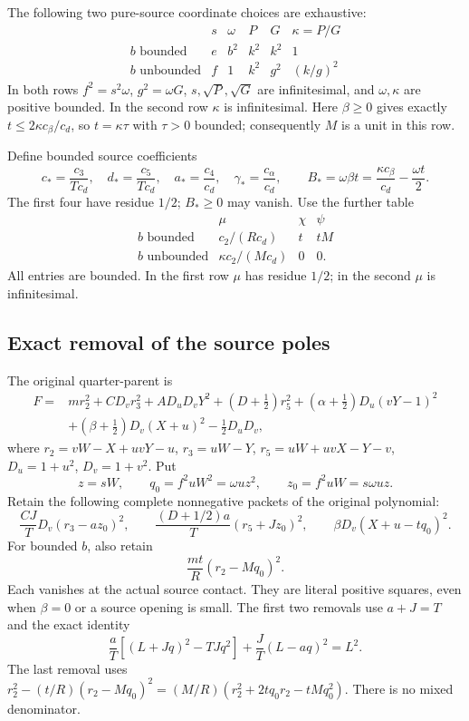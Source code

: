 The following two pure-source coordinate choices are exhaustive:
\[
\begin{array}{c|ccccc}
 &s&\omega&P&G&\kappa=P/G\\ \hline
 b\text{ bounded}&e&b^2&k^2&k^2&1\\
 b\text{ unbounded}&f&1&k^2&g^2&(k/g)^2
\end{array}                                                     \tag{EZ3}
\]
In both rows $f^2=s^2\omega$, $g^2=\omega G$,
$s,\sqrt P,\sqrt G$ are infinitesimal, and $\omega,\kappa$
are positive bounded. In the second row $\kappa$ is infinitesimal.
Here $\beta\geq0$ gives exactly
$t\leq2\kappa c_\beta/c_d$, so $t=\kappa\tau$ with
$\tau>0$ bounded; consequently $M$ is a unit in this row.

Define bounded source coefficients
\[
 c_*=\frac{c_3}{Tc_d},\quad d_*=\frac{c_5}{Tc_d},\quad
 a_*=\frac{c_4}{c_d},\quad \gamma_*=\frac{c_\alpha}{c_d},
 \qquad B_*=\omega\beta t
              =\frac{\kappa c_\beta}{c_d}-\frac{\omega t}{2}.
                                                               \tag{EZ4}
\]
The first four have residue $1/2$; $B_*\geq0$ may vanish.
Use the further table
\[
\begin{array}{c|ccc}
 &\mu&\chi&\psi\\ \hline
 b\text{ bounded}&c_2/(Rc_d)&t&tM\\
 b\text{ unbounded}&\kappa c_2/(Mc_d)&0&0 .
\end{array}                                                     \tag{EZ5}
\]
All entries are bounded. In the first row $\mu$ has residue
$1/2$; in the second $\mu$ is infinitesimal.

\subsection{Exact removal of the source poles}

The original quarter-parent is
\[
\begin{split}
 F={}&mr_2^2+CD_vr_3^2+AD_uD_vY^2
 +(D+\tfrac12)r_5^2+(\alpha+\tfrac12)D_u(vY-1)^2\\
 &+(\beta+\tfrac12)D_v(X+u)^2-\tfrac12D_uD_v,
\end{split}                                                     \tag{EZ6}
\]
where $r_2=vW-X+uvY-u$, $r_3=uW-Y$,
$r_5=uW+uvX-Y-v$, $D_u=1+u^2$, $D_v=1+v^2$.
Put
\[
 z=sW,\qquad q_0=f^2uW^2=\omega uz^2,\qquad
 z_0=f^2uW=s\omega uz.
\]
Retain the following complete nonnegative packets of the original
polynomial:
\[
 \frac{CJ}{T}D_v(r_3-az_0)^2,\qquad
 \frac{(D+1/2)a}{T}(r_5+Jz_0)^2,\qquad
 \beta D_v(X+u-tq_0)^2.                                        \tag{EZ7}
\]
For bounded $b$, also retain
\[
                       \frac{mt}{R}(r_2-Mq_0)^2.              \tag{EZ8}
\]
Each vanishes at the actual source contact. They are literal
positive squares, even when $\beta=0$ or a source opening is small.
The first two removals use $a+J=T$ and the exact identity
\[
 \frac aT[(L+Jq)^2-TJq^2]+\frac JT(L-aq)^2=L^2.
\]
The last removal uses
$r_2^2-(t/R)(r_2-Mq_0)^2
=(M/R)(r_2^2+2tq_0r_2-tMq_0^2)$.
There is no mixed denominator.

